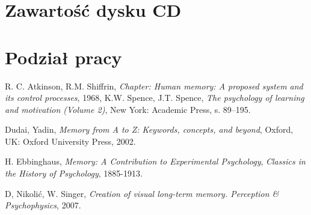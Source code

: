 \documentclass{pracamgr}
\begin{document}
\appendix

\chapter{Zawartość dysku CD}

\chapter{Podział pracy}

\begin{thebibliography}{99}

 R. C. Atkinson, R.M. Shiffrin, \textit{Chapter: Human memory: A proposed system and its control processes}, 1968, K.W. Spence, J.T. Spence, \textit{The psychology of learning and motivation (Volume 2)}, New York: Academic Press, s. 89–195.

 Dudai, Yadin, \textit{Memory from A to Z: Keywords, concepts, and beyond}, Oxford, UK: Oxford University Press, 2002.

 H. Ebbinghaus, \textit{Memory: A Contribution to Experimental Psychology}, \textit{Classics in the History of Psychology}, 1885-1913.


 D, Nikolić, W. Singer, \textit{Creation of visual long-term memory. Perception \& Psychophysics}, 2007.


\end{thebibliography}
\end{document}
